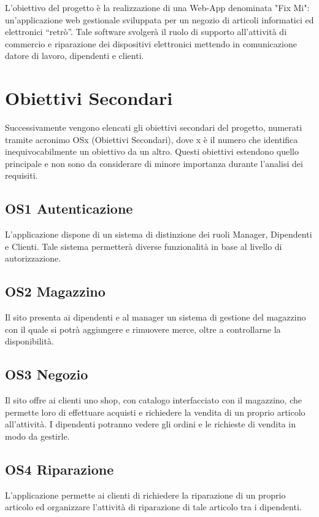 \documentclass{report}
\begin{document}
L’obiettivo del progetto è la realizzazione di una Web-App denominata "Fix Mi": un'applicazione web gestionale sviluppata per un negozio di articoli informatici ed elettronici “retrò”. Tale software svolgerà il ruolo di supporto all’attività di commercio e riparazione dei dispositivi elettronici mettendo in comunicazione datore di lavoro, dipendenti e clienti.


\section{Obiettivi Secondari}

Successivamente vengono elencati gli obiettivi secondari del progetto, numerati tramite acronimo OSx (Obiettivi Secondari), dove x è il numero che identifica inequivocabilmente un obiettivo da un altro. Questi obiettivi estendono quello principale e non sono da considerare di minore importanza durante l’analisi dei requisiti.


\subsection*{OS1 Autenticazione}
L’applicazione dispone di un sistema di distinzione dei ruoli Manager, Dipendenti e Clienti. Tale sistema permetterà diverse funzionalità in base al livello di autorizzazione.



\subsection*{OS2 Magazzino}
Il sito presenta ai dipendenti e al manager un sistema di gestione del magazzino con il quale si potrà aggiungere e rimuovere merce, oltre a controllarne la disponibilità.


\subsection*{OS3 Negozio}
Il sito offre ai clienti uno shop, con catalogo interfacciato con il magazzino, che permette loro di effettuare acquisti e richiedere la vendita di un proprio articolo all’attività. I dipendenti potranno vedere gli ordini e le richieste di vendita in modo da gestirle.


\subsection*{OS4 Riparazione}
L’applicazione permette ai clienti di richiedere la riparazione di un proprio articolo ed organizzare l’attività di riparazione di tale articolo tra i dipendenti.
\end{document}
